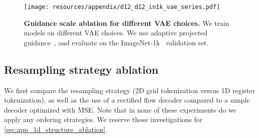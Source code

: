 \begin{figure}[ht!]
\centering
\texttt{[image: resources/appendix/d12\_d12\_in1k\_vae\_series.pdf]}
\caption{
\textbf{Guidance scale ablation for different VAE choices.} We train \oursbase models on different VAE choices. We use adaptive projected guidance~\cite{Sadat2024NormGuidance}, and evaluate on the ImageNet-1k~\cite{Russakovsky2014ImageNet} validation set.
}
\label{fig:app_flextok_norm_guidance_in1k_vae_ablations}
\end{figure}


\FloatBarrier
\subsection{Resampling strategy ablation}
\label{sec:app_resampling_image_tokens}

\begin{table}[ht!]
\caption{
    \textbf{Ablation of resampling strategies}. 
    We compare 2D grid tokenization with 1D tokenization, the use of a rectified flow decoder, the training noise schedule, as well as the use of an auxiliary REPA~\cite{Yu2024REPA} loss. We compare on reconstruction MAE, DreamSim, and rFID, as well as ImageNet-1k class-conditional generation gFID.
}
\label{tab:resampling_strategies}
\centering
{}
\end{table}

We first compare the resampling strategy (2D grid tokenization versus 1D register tokenization), as well as the use of a rectified flow decoder compared to a simple decoder optimized with MSE. Note that in none of these experiments do we apply any ordering strategies. We reserve those investigations for \cref{sec:app_1d_structure_ablation}. 

